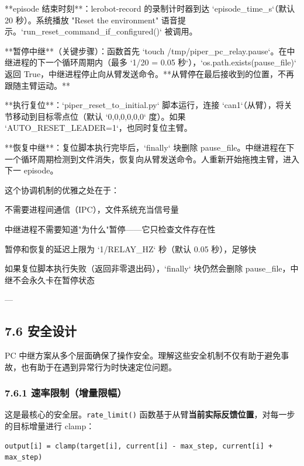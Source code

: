 \documentclass[UTF8,a4paper,11pt]{ctexart}
\begin{document}
{\item[2] **episode 结束时刻**：lerobot-record 的录制计时器到达 `episode_time_s`（默认 20 秒）。系统播放 "Reset the environment" 语音提示。`run_reset_command_if_configured()` 被调用。

\item[3] **暂停中继**（关键步骤）：函数首先 `touch /tmp/piper_pc_relay.pause`。在中继进程的下一个循环周期内（最多 `1/20 = 0.05 秒`），`os.path.exists(pause_file)` 返回 True，中继进程停止向从臂发送命令。**从臂停在最后接收到的位置，不再跟随主臂运动。**

\item[4] **执行复位**：`piper_reset_to_initial.py` 脚本运行，连接 `can1`（从臂），将关节移动到目标零点位（默认 `0,0,0,0,0,0` 度）。如果 `AUTO_RESET_LEADER=1`，也同时复位主臂。

\item[5] **恢复中继**：复位脚本执行完毕后，`finally` 块删除 pause_file。中继进程在下一个循环周期检测到文件消失，恢复向从臂发送命令。人重新开始拖拽主臂，进入下一 episode。

这个协调机制的优雅之处在于：
\item 不需要进程间通信（IPC），文件系统充当信号量
\item 中继进程不需要知道"为什么"暂停——它只检查文件存在性
\item 暂停和恢复的延迟上限为 `1/RELAY_HZ` 秒（默认 0.05 秒），足够快
\item 如果复位脚本执行失败（返回非零退出码），`finally` 块仍然会删除 pause_file，中继不会永久卡在暂停状态

---

\subsection{7.6 安全设计}

PC 中继方案从多个层面确保了操作安全。理解这些安全机制不仅有助于避免事故，也有助于在遇到异常行为时快速定位问题。

\subsubsection{7.6.1 速率限制（增量限幅）}

这是最核心的安全层。\texttt{rate_limit()} 函数基于从臂\textbf{当前实际反馈位置}，对每一步的目标增量进行 clamp：

\begin{lstlisting}[language=text]
output[i] = clamp(target[i], current[i] - max_step, current[i] + max_step)
\end{lstlisting}

}
\end{document}

